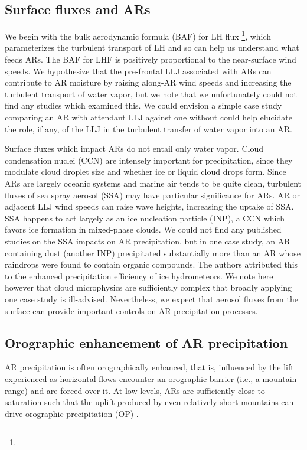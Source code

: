 \documentclass[letterpaper,12pt]{article}
\begin{document}
\subsection{Surface fluxes and ARs}

We begin with the bulk aerodynamic formula (BAF) for LH flux \footnote{}, which parameterizes the turbulent transport of LH and so can help us understand what feeds ARs. The BAF for LHF is positively proportional to the near-surface wind speeds. We hypothesize that the pre-frontal LLJ associated with ARs can contribute to AR moisture by raising along-AR wind speeds and increasing the turbulent transport of water vapor, but we note that we unfortunately could not find any studies which examined this. We could envision a simple case study comparing an AR with attendant LLJ against one without could help elucidate the role, if any, of the LLJ in the turbulent transfer of water vapor into an AR. 

Surface fluxes which impact ARs do not entail only water vapor. Cloud condensation nuclei (CCN) are intensely important for precipitation, since they modulate cloud droplet size and whether ice or liquid cloud drops form. Since ARs are largely oceanic systems and marine air tends to be quite clean, turbulent fluxes of sea spray aerosol (SSA) may have particular significance for ARs. AR or adjacent LLJ wind speeds can raise wave heights, increasing the uptake of SSA. SSA happens to act largely as an ice nucleation particle (INP), a CCN which favors ice formation in mixed-phase clouds. We could not find any published studies on the SSA impacts on AR precipitation, but in one case study, \cite{Ault2011} an AR containing dust (another INP) precipitated substantially more than an AR whose raindrops were found to contain organic compounds. The authors attributed this to the enhanced precipitation efficiency of ice hydrometeors. We note here however that cloud microphysics are sufficiently complex that broadly applying one case study is ill-advised. Nevertheless, we expect that aerosol fluxes from the surface can provide important controls on AR precipitation processes. 

\subsection{Orographic enhancement of AR precipitation}

AR precipitation is often orographically enhanced, that is, influenced by the lift experienced as horizontal flows encounter an orographic barrier (i.e., a mountain range) and are forced over it. At low levels, ARs are sufficiently close to saturation such that the uplift produced by even relatively short mountains can drive orographic precipitation (OP) \cite{Neiman2008MeteorologicalObservations}. 
\end{document}
